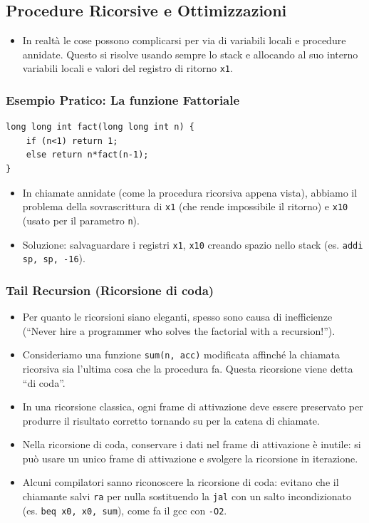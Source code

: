 \documentclass[12pt, a4paper]{article}
\begin{document}
\subsection{Procedure Ricorsive e Ottimizzazioni}
\begin{itemize}
    \item In realtà le cose possono complicarsi per via di variabili locali e procedure annidate. Questo si risolve usando sempre lo stack e allocando al suo interno variabili locali e valori del registro di ritorno \texttt{x1}.
\end{itemize}

\subsubsection{Esempio Pratico: La funzione Fattoriale}
\begin{verbatim}
long long int fact(long long int n) {
    if (n<1) return 1;
    else return n*fact(n-1);
}
\end{verbatim}
\begin{itemize}
    \item In chiamate annidate (come la procedura ricorsiva appena vista), abbiamo il problema della sovrascrittura di \texttt{x1} (che rende impossibile il ritorno) e \texttt{x10} (usato per il parametro \texttt{n}).
    \item Soluzione: salvaguardare i registri \texttt{x1}, \texttt{x10} creando spazio nello stack (es. \texttt{addi sp, sp, -16}).
\end{itemize}

\subsubsection{Tail Recursion (Ricorsione di coda)}
\begin{itemize}
    \item Per quanto le ricorsioni siano eleganti, spesso sono causa di inefficienze (``Never hire a programmer who solves the factorial with a recursion!'').
    \item Consideriamo una funzione \texttt{sum(n, acc)} modificata affinché la chiamata ricorsiva sia l'ultima cosa che la procedura fa. Questa ricorsione viene detta ``di coda''.
    \item In una ricorsione classica, ogni frame di attivazione deve essere preservato per produrre il risultato corretto tornando su per la catena di chiamate.
    \item Nella ricorsione di coda, conservare i dati nel frame di attivazione è inutile: si può usare un unico frame di attivazione e svolgere la ricorsione in iterazione.
    \item Alcuni compilatori sanno riconoscere la ricorsione di coda: evitano che il chiamante salvi \texttt{ra} per nulla sostituendo la \texttt{jal} con un salto incondizionato (es. \texttt{beq x0, x0, sum}), come fa il gcc con \texttt{-O2}.
\end{itemize}
\end{document}
